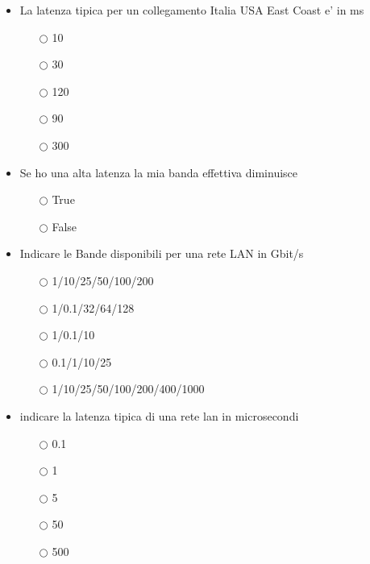 \documentclass[10pt,twocolumn]{article}
\begin{document}
\begin{itemize}
    \item La latenza tipica per un collegamento Italia USA East Coast e' in ms
          \begin{itemize}
              \item[$\bigcirc$] 10
              \item[$\bigcirc$] 30
              \item[$\bigcirc$] 120
              \item[$\bigcirc$] 90
              \item[$\bigcirc$] 300
          \end{itemize}
\end{itemize}
\begin{itemize}
    \item Se ho una alta latenza la mia banda effettiva diminuisce
          \begin{itemize}
              \item[$\bigcirc$] True
              \item[$\bigcirc$] False
          \end{itemize}
\end{itemize}
\begin{itemize}
    \item Indicare le Bande disponibili per una rete LAN in Gbit/s
          \begin{itemize}
              \item[$\bigcirc$] 1/10/25/50/100/200
              \item[$\bigcirc$] 1/0.1/32/64/128
              \item[$\bigcirc$] 1/0.1/10
              \item[$\bigcirc$] 0.1/1/10/25
              \item[$\bigcirc$] 1/10/25/50/100/200/400/1000
          \end{itemize}
\end{itemize}
\begin{itemize}
    \item indicare la latenza tipica di una rete lan in microsecondi
          \begin{itemize}
              \item[$\bigcirc$] 0.1
              \item[$\bigcirc$] 1
              \item[$\bigcirc$] 5
              \item[$\bigcirc$] 50
              \item[$\bigcirc$] 500
          \end{itemize}
\end{itemize}
\end{document}
